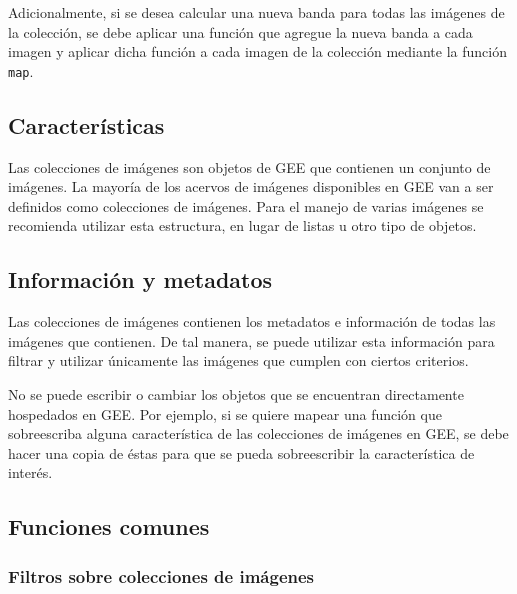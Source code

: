 \documentclass[
]{article}
\begin{document}
Adicionalmente, si se desea calcular una nueva banda para todas las
imágenes de la colección, se debe aplicar una función que agregue la
nueva banda a cada imagen y aplicar dicha función a cada imagen de la
colección mediante la función \texttt{map}.

\hypertarget{caracteruxedsticas-1}{%
\subsection{Características}\label{caracteruxedsticas-1}}

Las colecciones de imágenes son objetos de GEE que contienen un conjunto
de imágenes. La mayoría de los acervos de imágenes disponibles en GEE
van a ser definidos como colecciones de imágenes. Para el manejo de
varias imágenes se recomienda utilizar esta estructura, en lugar de
listas u otro tipo de objetos.

\hypertarget{informaciuxf3n-y-metadatos-1}{%
\subsection{Información y
metadatos}\label{informaciuxf3n-y-metadatos-1}}

Las colecciones de imágenes contienen los metadatos e información de
todas las imágenes que contienen. De tal manera, se puede utilizar esta
información para filtrar y utilizar únicamente las imágenes que cumplen
con ciertos criterios.

\begin{tipblock}
No se puede escribir o cambiar los objetos que se encuentran
directamente hospedados en GEE. Por ejemplo, si se quiere mapear una
función que sobreescriba alguna característica de las colecciones de
imágenes en GEE, se debe hacer una copia de éstas para que se pueda
sobreescribir la característica de interés.

\end{tipblock}

\hypertarget{funciones-comunes-1}{%
\subsection{Funciones comunes}\label{funciones-comunes-1}}

\hypertarget{filtros-sobre-colecciones-de-imuxe1genes}{%
\subsubsection{Filtros sobre colecciones de
imágenes}\label{filtros-sobre-colecciones-de-imuxe1genes}}
\end{document}
